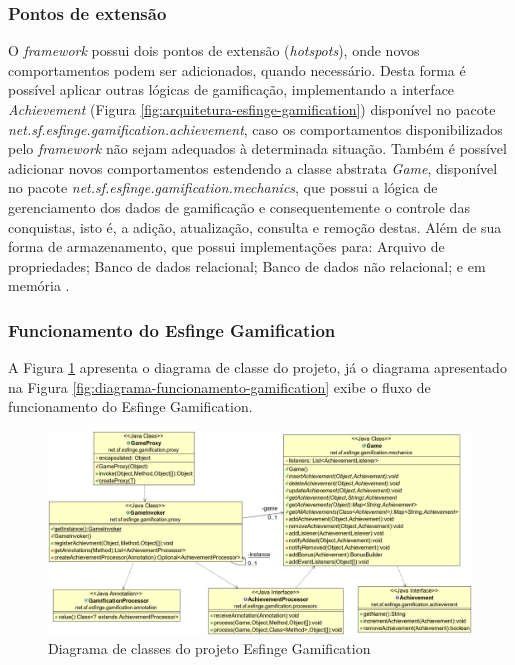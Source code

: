 \subsubsection{Pontos de extensão}

O \textit{framework} possui dois pontos de extensão (\textit{hotspots}), onde novos comportamentos podem ser adicionados, quando necessário. Desta forma é possível aplicar outras lógicas de gamificação, implementando a interface \textit{Achievement} (Figura \ref{fig:arquitetura-esfinge-gamification}) disponível no pacote \textit{net.sf.esfinge.gamification.achievement}, caso os comportamentos disponibilizados pelo \textit{framework} não sejam adequados \`a determinada situação. Também é possível adicionar novos comportamentos estendendo a classe abstrata \textit{Game}, disponível no pacote \textit{net.sf.esfinge.gamification.mechanics}, que possui a lógica de gerenciamento dos dados de gamificação e consequentemente o controle das conquistas, isto é, a adição, atualização, consulta e remoção destas. Além de sua forma de armazenamento, que possui implementações para: Arquivo de propriedades; Banco de dados relacional; Banco de dados não relacional; e em memória \cite{esfingegamification2011}.

\subsubsection{Funcionamento do Esfinge Gamification}

\par A Figura \ref{fig:gamification-diagrama-classe-cap2} apresenta o diagrama de classe do projeto, já o diagrama apresentado na Figura \ref{fig:diagrama-funcionamento-gamification} exibe o fluxo de funcionamento do Esfinge Gamification.

\begin{figure}[H]
    \centering
    \includegraphics[scale=0.35]{src/imagens/cap2/gamification-class-diagram-cap2.png}
    \caption{Diagrama de classes do projeto Esfinge Gamification}
    \label{fig:gamification-diagrama-classe-cap2}
\end{figure}

